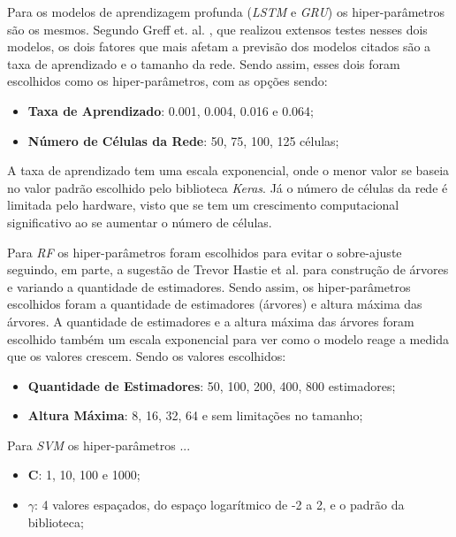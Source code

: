 Para os modelos de aprendizagem profunda (\textit{\acrshort{LSTM}} e \textit{\acrshort{GRU}}) os hiper-parâmetros são os mesmos. Segundo Greff et. al. \cite{Greff_2015}, que realizou extensos testes nesses dois modelos, os dois fatores que mais afetam a previsão dos modelos citados são a taxa de aprendizado e o tamanho da rede. Sendo assim, esses dois foram escolhidos como os hiper-parâmetros, com as opções sendo:

\begin{itemize}
    \item \textbf{Taxa de Aprendizado}: 0.001, 0.004, 0.016 e 0.064;
    \item \textbf{Número de Células da Rede}: 50, 75, 100, 125 células;
\end{itemize}

A taxa de aprendizado tem uma escala exponencial, onde o menor valor se baseia no valor padrão escolhido pelo biblioteca \textit{Keras}. Já o número de células da rede é limitada pelo hardware, visto que se tem um crescimento computacional significativo ao se aumentar o número de células. 

Para \textit{\acrshort{RF}} os hiper-parâmetros foram escolhidos para evitar o sobre-ajuste seguindo, em parte, a sugestão de Trevor Hastie et al. \cite{hastie2005elements} para construção de árvores e variando a quantidade de estimadores. Sendo assim, os hiper-parâmetros escolhidos foram a quantidade de estimadores (árvores) e altura máxima das árvores. A quantidade de estimadores e a altura máxima das árvores foram escolhido também um escala exponencial para ver como o modelo reage a medida que os valores crescem.  Sendo os valores escolhidos:

\begin{itemize}
    \item \textbf{Quantidade de Estimadores}: 50, 100, 200, 400, 800 estimadores;
    \item \textbf{Altura Máxima}: 8, 16, 32, 64 e sem limitações no tamanho;
\end{itemize}

Para \textit{\acrshort{SVM}} os hiper-parâmetros ...

\begin{itemize}
    \item \textbf{C}: 1, 10, 100 e 1000;
    \item \textbf{\(\gamma\)}: 4 valores espaçados, do espaço logarítmico de -2 a 2, e o padrão da biblioteca; 
\end{itemize}


